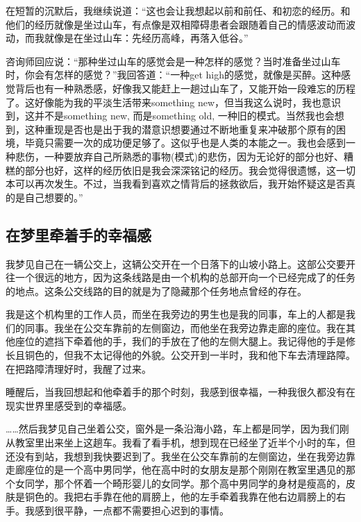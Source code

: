 在短暂的沉默后，我继续说道：“这也会让我想起以前和前任、和初恋的经历。和他们的经历就像是坐过山车，有点像是双相障碍患者会跟随着自己的情感波动而波动，而我就像是在坐过山车：先经历高峰，再落入低谷。”

咨询师回应说：“那种坐过山车的感觉会是一种怎样的感觉？当时准备坐过山车时，你会有怎样的感觉？”我回答道：“一种get high的感觉，就像是买醉。这种感觉背后也有一种熟悉感，好像我又能赶上一趟过山车了，又能开始一段难忘的历程了。这好像能为我的平淡生活带来something new，但当我这么说时，我也意识到，这并不是something new, 而是something old, 一种旧的模式。当然我也会想到，这种重现是否也是出于我的潜意识想要通过不断地重复来冲破那个原有的困境，毕竟只需要一次的成功便足够了。这似乎也是人类的本能之一。我也会感到一种悲伤，一种要放弃自己所熟悉的事物(模式)的悲伤，因为无论好的部分也好、糟糕的部分也好，这样的经历依旧是我会深深铭记的经历。我会觉得很遗憾，这一切本可以再次发生。不过，当我看到喜欢之情背后的拯救欲后，我开始怀疑这是否真的是自己想要的。”



\subsection*{在梦里牵着手的幸福感}

我梦见自己在一辆公交上，这辆公交开在一个日落下的山坡小路上。这部公交要开往一个很远的地方，因为这条线路是由一个机构的总部开向一个已经完成了的任务的地点。这条公交线路的目的就是为了隐藏那个任务地点曾经的存在。

我是这个机构里的工作人员，而坐在我旁边的男生也是我的同事，车上的人都是我们的同事。我坐在公交车靠前的左侧窗边，而他坐在我旁边靠走廊的座位。我在其他座位的遮挡下牵着他的手，我们的手放在了他的左侧大腿上。我记得他的手是修长且铜色的，但我不太记得他的外貌。公交开到一半时，我和他下车去清理路障。在把路障清理好时，我醒了过来。

睡醒后，当我回想起和他牵着手的那个时刻，我感到很幸福，一种我很久都没有在现实世界里感受到的幸福感。

……然后我梦见自己坐着公交，窗外是一条沿海小路，车上都是同学，因为我们刚从教室里出来坐上这趟车。我看了看手机，想到现在已经坐了近半个小时的车，但还没有到站，我想到我快要迟到了。我坐在公交车靠前的左侧窗边，坐在我旁边靠走廊座位的是一个高中男同学，他在高中时的女朋友是那个刚刚在教室里遇见的那个女同学，那个怀着一个畸形婴儿的女同学。那个高中男同学的身材是瘦高的，皮肤是铜色的。我把右手靠在他的肩膀上，他的左手牵着我靠在他右边肩膀上的右手。我感到很平静，一点都不需要担心迟到的事情。

